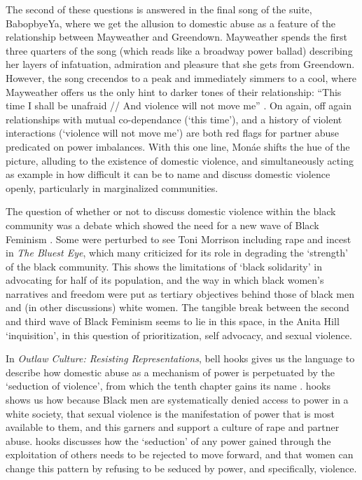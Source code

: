\documentclass[a4paper, 11pt]{article} %
\begin{document}
The second of these questions is answered in the final song of the suite, BabopbyeYa, where we get the allusion to domestic abuse as a feature of the relationship between Mayweather and Greendown.
Mayweather spends the first three quarters of the song (which reads like a broadway power ballad) describing her layers of infatuation, admiration and pleasure that she gets from Greendown.
However, the song crecendos to a peak and immediately simmers to a cool, where Mayweather offers us the only hint to darker tones of their relationship: ``This time I shall be unafraid // And violence will not move me'' \cite{babopbyeya}.
On again, off again relationships with mutual co-dependance (`this time'), and a history of violent interactions (`violence will not move me') are both red flags for partner abuse predicated on power imbalances.
With this one line, Mon\'ae shifts the hue of the picture, alluding to the existence of domestic violence, and simultaneously acting as example in how difficult it can be to name and discuss domestic violence openly, particularly in marginalized communities.

The question of whether or not to discuss domestic violence within the black community was a debate which showed the need for a new wave of Black Feminism \cite{rebeccawalker}.
Some were perturbed to see Toni Morrison including rape and incest in \emph{The Bluest Eye}, which many criticized for its role in degrading the `strength' of the black community.
This shows the limitations of `black solidarity' in advocating for half of its population, and the way in which black women's narratives and freedom were put as tertiary objectives behind those of black men and (in other discussions) white women.
The tangible break between the second and third wave of Black Feminism seems to lie in this space, in the Anita Hill `inquisition', in this question of prioritization, self advocacy, and sexual violence.

In \emph{Outlaw Culture: Resisting Representations}, bell hooks gives us the language to describe how domestic abuse as a mechanism of power is perpetuated by the `seduction of violence', from which the tenth chapter gains its name \cite{hooks1994outlaw}.
hooks shows us how because Black men are systematically denied access to power in a white society, that sexual violence is the manifestation of power that is most available to them, and this garners and support a culture of rape and partner abuse.
hooks discusses how the `seduction' of any power gained through the exploitation of others needs to be rejected to move forward, and that women can change this pattern by refusing to be seduced by power, and specifically, violence.
\end{document}
